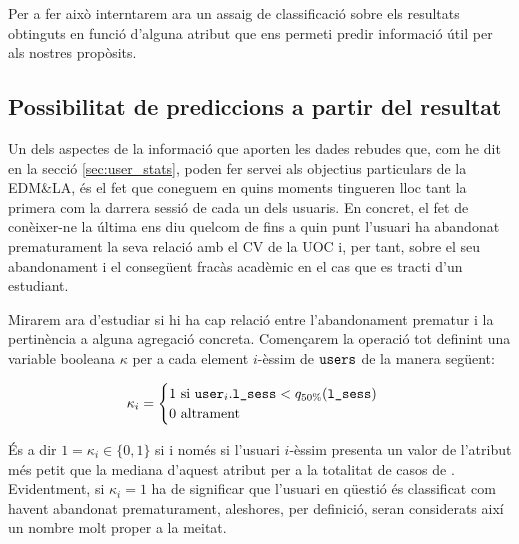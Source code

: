 \documentclass[
	a4paper,
	twoside,
	justified
]{tufte-book}
\begin{document}
Per a fer això interntarem ara un assaig de classificació sobre els resultats obtinguts en funció d'alguna atribut que ens permeti predir informació útil per als nostres propòsits.

\subsection{Possibilitat de prediccions a partir del resultat}

Un dels aspectes de la informació que aporten les dades rebudes que, com he dit en la secció \ref{sec:user_stats}, poden fer servei als objectius particulars de la EDM\&LA, és el fet que coneguem en quins moments tingueren lloc tant la primera com la darrera sessió de cada un dels usuaris. En concret, el fet de conèixer-ne la última ens diu quelcom de fins a quin punt l'usuari ha abandonat prematurament la seva relació amb el CV de la UOC i, per tant, sobre el seu abandonament i el consegüent fracàs acadèmic en el cas que es tracti d'un estudiant.

Mirarem ara d'estudiar si hi ha cap relació entre l'abandonament prematur i la pertinència a alguna agregació concreta. Començarem la operació tot definint una variable booleana $\kappa$ per a cada element $i$-èssim de $\texttt{users}$ de la manera següent:       

$$
	\kappa_i = \begin{cases}
						1 \text{ si } \texttt{user}_i.\texttt{l\_sess} < q_{50\%}(\texttt{l\_sess}) \\
						0 \text{ altrament} 
					\end{cases}
$$

És a dir $1 = \kappa_i \in \{0,1\}$ si i només si l'usuari $i$-èssim presenta un valor de l'atribut  més petit que la mediana d'aquest atribut per a la totalitat de casos de . Evidentment, si $\kappa_i = 1$ ha de significar que l'usuari en qüestió és classificat com havent abandonat prematurament, aleshores, per definició, seran considerats així un nombre molt proper a la meitat.  
\end{document}
